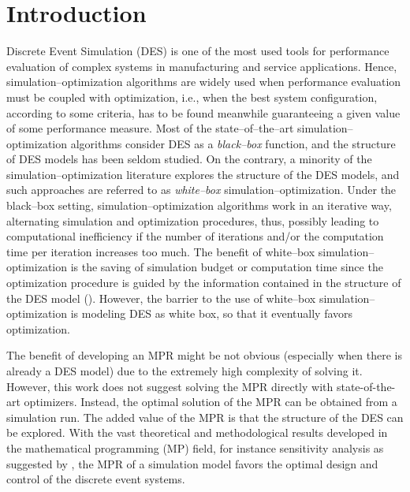 \documentclass[suppldata]{interact}
\theoremstyle{plain}
\theoremstyle{definition}
\theoremstyle{remark}
\begin{document}
\newpage
\section{Introduction}
Discrete Event Simulation (DES) is one of the most used tools for performance evaluation of %
complex systems in manufacturing and service applications. Hence, simulation--optimization algorithms are widely used %
when performance evaluation must be coupled with optimization, i.e., when the best system configuration, according to some criteria, has to be found meanwhile guaranteeing a given value of some performance measure.  
Most of the state--of--the--art simulation--optimization algorithms consider DES as a \textit{black--box} function, and the structure of DES models has been seldom studied. On the contrary, a minority of the simulation--optimization literature explores the structure of the DES models, and %
such approaches are referred to as \textit{white--box} simulation--optimization. 
Under the black--box setting, simulation--optimization algorithms work in an iterative way, alternating simulation and optimization procedures, 
thus, possibly leading to computational inefficiency if the number of iterations and/or the computation time per iteration increases too much. 
The benefit of white--box simulation--optimization is the saving of simulation budget or computation time since 
the optimization procedure is guided by the information contained in the structure of the DES model (\cite{zhang2020sample}). However, the barrier to the use of white--box simulation--optimization is modeling DES as white box, so that it eventually favors optimization. 

The benefit of developing an MPR might be not obvious (especially when there is already a DES model) due to the extremely high complexity of solving it. 
However, this work does not suggest solving the MPR directly with state-of-the-art optimizers. Instead, the optimal solution of the MPR can be obtained from a simulation run. The added value of the MPR is that the structure of the DES can be explored. With the vast theoretical and methodological results developed in the mathematical programming (MP) field, for instance sensitivity analysis as suggested by \cite{chan2008optimization}, the MPR of a simulation model favors the optimal design and control of the discrete event systems. 
\end{document}

